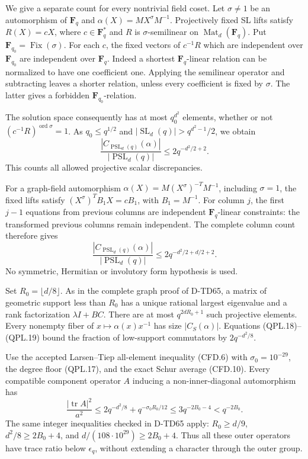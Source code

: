 We give a separate count for every nontrivial field coset.
Let \(\sigma\ne1\) be an automorphism of \(\mathbf F_q\) and
\(\alpha(X)=M X^\sigma M^{-1}\).
Projectively fixed SL lifts satisfy
\(R(X)=cX\), where \(c\in\mathbf F_q^*\) and
\(R\) is \(\sigma\)-semilinear on
\(\operatorname{Mat}_d(\mathbf F_q)\).
Put \(\mathbf F_{q_0}=\operatorname{Fix}(\sigma)\).
For each \(c\), the fixed vectors of \(c^{-1}R\) which are
independent over \(\mathbf F_{q_0}\) are independent over
\(\mathbf F_q\).
Indeed a shortest \(\mathbf F_q\)-linear relation can be
normalized to have one coefficient one. Applying the
semilinear operator and subtracting leaves a shorter
relation, unless every coefficient is fixed by \(\sigma\).
The latter gives a forbidden \(\mathbf F_{q_0}\)-relation.

The solution space consequently has at most \(q_0^{d^2}\)
elements, whether or not \((c^{-1}R)^{\operatorname{ord}\sigma}=1\).
As \(q_0\le q^{1/2}\) and
\(|\operatorname{SL}_d(q)|>q^{d^2-1}/2\), we obtain
\[
             \frac{|C_{\operatorname{PSL}_d(q)}(\alpha)|}
                         {|\operatorname{PSL}_d(q)|}
                    \le2q^{-d^2/2+2}.
 \tag{QPL.18}
\]
This counts all allowed projective scalar discrepancies.

For a graph-field automorphism
\(\alpha(X)=M(X^\sigma)^{-T}M^{-1}\), including \(\sigma=1\),
the fixed lifts satisfy
\((X^\sigma)^TB_1X=cB_1\), with \(B_1=M^{-1}\).
For column \(j\), the first \(j-1\) equations from previous
columns are independent \(\mathbf F_q\)-linear constraints:
the transformed previous columns remain independent.
The complete column count therefore gives
\[
             \frac{|C_{\operatorname{PSL}_d(q)}(\alpha)|}
                         {|\operatorname{PSL}_d(q)|}
                    \le2q^{-d^2/2+d/2+2}.
 \tag{QPL.19}
\]
No symmetric, Hermitian or involutory form hypothesis is used.

Set \(R_0=\lfloor d/8\rfloor\).
As in the complete graph proof of D-TD65, a matrix of
geometric support less than \(R_0\) has a unique rational
largest eigenvalue and a rank factorization \(\lambda I+BC\).
There are at most \(q^{2dR_0+1}\) such projective elements.
Every nonempty fiber of
\(x\mapsto\alpha(x)x^{-1}\) has size \(|C_S(\alpha)|\).
Equations (QPL.18)--(QPL.19) bound the fraction of low-support
commutators by \(2q^{-d^2/8}\).

Use the accepted Larsen--Tiep all-element inequality (CFD.6)
with \(\sigma_0=10^{-29}\), the degree floor (QPL.17), and
the exact Schur average (CFD.10). Every compatible component
operator \(A\) inducing a non-inner-diagonal automorphism has
\[
 \frac{|\operatorname{tr}A|^2}{a^2}
       \le2q^{-d^2/8}+q^{-\sigma_0R_0/12}
       \le3q^{-2B_0-4}<q^{-2B_0}.
 \tag{QPL.20}
\]
The same integer inequalities checked in D-TD65 apply:
\(R_0\ge d/9\), \(d^2/8\ge2B_0+4\), and
\(d/(108\cdot10^{29})\ge2B_0+4\).
Thus all these outer operators have trace ratio below
\(\epsilon_q\), without extending a character through the
outer group.

